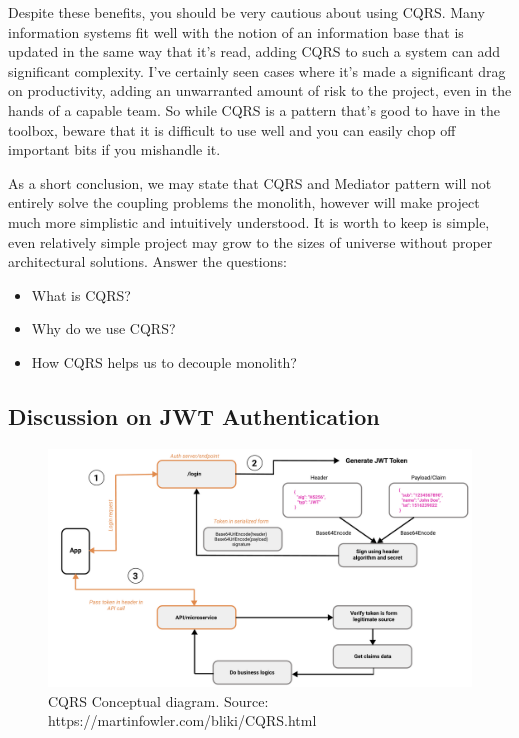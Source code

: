 Despite these benefits, you should be very cautious about using CQRS.
Many information systems fit well with the notion of an information base that is updated in the same way that it's read,
adding CQRS to such a system can add significant complexity.
I've certainly seen cases where it's made a significant drag on productivity, adding an unwarranted amount of risk to the
project, even in the hands of a capable team.
So while CQRS is a pattern that's good to have in the toolbox, beware that it is difficult to use well and you can easily
chop off important bits if you mishandle it.

As a short conclusion, we may state that CQRS and Mediator pattern will not entirely solve the coupling problems the monolith,
however will make project much more simplistic and intuitively understood.
It is worth to keep is simple,
even relatively simple project may grow to the sizes of universe without proper architectural solutions.
Answer the questions:
\begin{itemize}
    \item What is CQRS?
    \item Why do we use CQRS?
    \item How CQRS helps us to decouple monolith?
\end{itemize}

\subsection{Discussion on JWT Authentication}\label{subsec:discussion-on-jwt-authentication}
\begin{figure}[H]
    \centering
    \includegraphics[width=1\textwidth]{Pictures/jwt_auth_scheme.pdf}
    \caption{CQRS Conceptual diagram. Source: https://martinfowler.com/bliki/CQRS.html}\label{fig:figure3}
\end{figure}

